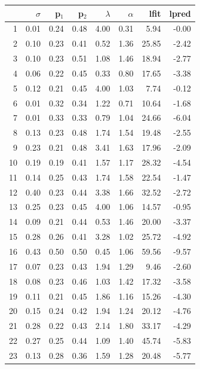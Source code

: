 \documentclass[11pt, a4paper, oneside,final,notitlepage,onecolumn]{article}\usepackage[]{graphicx}\usepackage[]{color}
\begin{document}
\clearpage 

\begin{longtable}{rrrrrrrr}
  \hline
 & $\sigma$ & p$_{1}$ & p$_{2}$ & $\lambda$ & $\alpha$ & lfit & lpred \\ 
  \hline
1 & 0.01 & 0.24 & 0.48 & 4.00 & 0.31 & 5.94 & -0.00 \\ 
  2 & 0.10 & 0.23 & 0.41 & 0.52 & 1.36 & 25.85 & -2.42 \\ 
  3 & 0.10 & 0.23 & 0.51 & 1.08 & 1.46 & 18.94 & -2.77 \\ 
  4 & 0.06 & 0.22 & 0.45 & 0.33 & 0.80 & 17.65 & -3.38 \\ 
  5 & 0.12 & 0.21 & 0.45 & 4.00 & 1.03 & 7.74 & -0.12 \\ 
  6 & 0.01 & 0.32 & 0.34 & 1.22 & 0.71 & 10.64 & -1.68 \\ 
  7 & 0.01 & 0.33 & 0.33 & 0.79 & 1.04 & 24.66 & -6.04 \\ 
  8 & 0.13 & 0.23 & 0.48 & 1.74 & 1.54 & 19.48 & -2.55 \\ 
  9 & 0.23 & 0.21 & 0.48 & 3.41 & 1.63 & 17.96 & -2.09 \\ 
  10 & 0.19 & 0.19 & 0.41 & 1.57 & 1.17 & 28.32 & -4.54 \\ 
  11 & 0.14 & 0.25 & 0.43 & 1.74 & 1.58 & 22.54 & -1.47 \\ 
  12 & 0.40 & 0.23 & 0.44 & 3.38 & 1.66 & 32.52 & -2.72 \\ 
  13 & 0.25 & 0.23 & 0.45 & 4.00 & 1.06 & 14.57 & -0.95 \\ 
  14 & 0.09 & 0.21 & 0.44 & 0.53 & 1.46 & 20.00 & -3.37 \\ 
  15 & 0.28 & 0.26 & 0.41 & 3.28 & 1.02 & 25.72 & -4.92 \\ 
  16 & 0.43 & 0.50 & 0.50 & 0.45 & 1.06 & 59.56 & -9.57 \\ 
  17 & 0.07 & 0.23 & 0.43 & 1.94 & 1.29 & 9.46 & -2.60 \\ 
  18 & 0.08 & 0.23 & 0.46 & 1.03 & 1.42 & 17.32 & -3.58 \\ 
  19 & 0.11 & 0.21 & 0.45 & 1.86 & 1.16 & 15.26 & -4.30 \\ 
  20 & 0.15 & 0.24 & 0.42 & 1.94 & 1.24 & 20.12 & -4.76 \\ 
  21 & 0.28 & 0.22 & 0.43 & 2.14 & 1.80 & 33.17 & -4.29 \\ 
  22 & 0.27 & 0.25 & 0.44 & 1.09 & 1.40 & 45.74 & -5.83 \\ 
  23 & 0.13 & 0.28 & 0.36 & 1.59 & 1.28 & 20.48 & -5.77 \\ 

\end{longtable}
\end{document}
